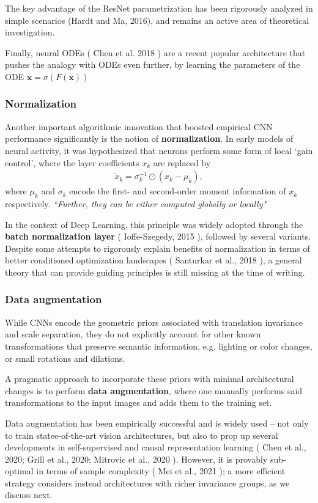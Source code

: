 \documentclass[12pt]{article}
\numberwithin{equation}{section}
\theoremstyle{definition}
\newcommand{		\eq		}[1]	{	\begin{align*}#1\end{align*}	}%
\newcommand{		\B		}	{\textbf					} %
\newcommand{		\1		}	{	\bm{1}					}%
\begin{document}
The key advantage of the ResNet parametrization has been rigorously analyzed in simple scenarios (Hardt and Ma, 2016), and remains an active area of theoretical investigation. 

Finally, neural ODEs ( Chen et al. 2018 ) are a recent popular architecture that pushes the analogy with ODEs even further, by learning the parameters of the ODE $\dot{\mathbf{x}} = \sigma ( F( \mathbf{x} ))$

\subsubsection*{Normalization} 

Another important algorithmic innovation that boosted empirical CNN performance significantly is the notion of \B{normalization}. In early models of neural activity, it was hypothesized that neurons perform some form of local `gain control', where the layer coefficients $x_k$ are replaced by 
\eq{
\tilde{x}_k = \sigma_k^{-1} \odot ( x_k - \mu_k) ,
}
where $\mu_k$ and $\sigma_k$ encode the first- and second-order moment information of $x_k$ respectively. \emph{``Further, they can be either computed globally or locally"}

In the context of Deep Learning, this principle was widely adopted through the \B{batch normalization layer} ( Ioffe-Szegedy, 2015 ), followed by several variants. Despite some attempts to rigorously explain benefits of normalization in terms of better conditioned optimization landscapes ( Santurkar et al., 2018 ), a general theory that can provide guiding principles is still missing at the time of writing.

\subsubsection*{Data augmentation} 

While CNNs encode the geometric priors associated with translation invariance and scale separation, they do not explicitly account for other known transformations that preserve semantic information, e.g. lighting or color changes, or small rotations and dilations.

A pragmatic approach to incorporate these priors with minimal architectural changes is to perform \B{data augmentation}, where one manually performs said transformations to the input images and adds them to the training set.

Data augmentation has been empirically successful and is widely used -- not only to train statee-of-the-art vision architectures, but also to prop up several developments in self-supervised and causal representation learning ( Chen et al., 2020; Grill et al., 2020; Mitrovic et al., 2020 ). However, it is provably sub-optimal in terms of sample complexity ( Mei et al., 2021 ); a more efficient strategy considers instead architectures with richer invariance groups, as we discuss next.
\end{document}
